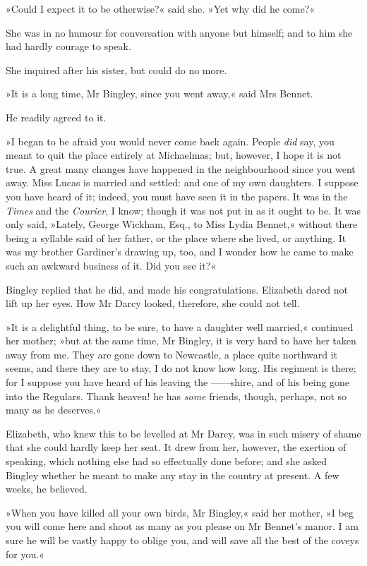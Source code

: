 »Could I expect it to be otherwise?« said she. »Yet why did he come?«

She was in no humour for conversation with anyone but himself; and to him she had hardly courage to speak.

She inquired after his sister, but could do no more.

»It is a long time, Mr Bingley, since you went away,« said Mrs Bennet.

He readily agreed to it.

»I began to be afraid you would never come back again. People \textit{did} say, you meant to quit the place entirely at Michaelmas; but, however, I hope it is not true. A great many changes have happened in the neighbourhood since you went away. Miss Lucas is married and settled: and one of my own daughters. I suppose you have heard of it; indeed, you must have seen it in the papers. It was in the \textit{Times} and the \textit{Courier}, I know; though it was not put in as it ought to be. It was only said, »Lately, George Wickham, Esq., to Miss Lydia Bennet,« without there being a syllable said of her father, or the place where she lived, or anything. It was my brother Gardiner's drawing up, too, and I wonder how he came to make such an awkward business of it. Did you see it?«

Bingley replied that he did, and made his congratulations. Elizabeth dared not lift up her eyes. How Mr Darcy looked, therefore, she could not tell.

»It is a delightful thing, to be sure, to have a daughter well married,« continued her mother; »but at the same time, Mr Bingley, it is very hard to have her taken away from me. They are gone down to Newcastle, a place quite northward it seems, and there they are to stay, I do not know how long. His regiment is there; for I suppose you have heard of his leaving the ——shire, and of his being gone into the Regulars. Thank heaven! he has \textit{some} friends, though, perhaps, not so many as he deserves.«

Elizabeth, who knew this to be levelled at Mr Darcy, was in such misery of shame that she could hardly keep her seat. It drew from her, however, the exertion of speaking, which nothing else had so effectually done before; and she asked Bingley whether he meant to make any stay in the country at present. A few weeks, he believed.

»When you have killed all your own birds, Mr Bingley,« said her mother, »I beg you will come here and shoot as many as you please on Mr Bennet's manor. I am sure he will be vastly happy to oblige you, and will save all the best of the coveys for you.«

